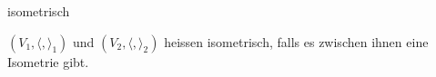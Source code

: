 \documentclass[class=article, crop=false]{standalone}
\begin{document}
\begin{zettel}{isometrisch}
\begin{flashcard}[]{}
	\begin{definition}[isometrisch]
		$(V_1, \langle ,\rangle _1)$ und $(V_2, \langle ,\rangle _2)$ heissen isometrisch, falls es zwischen ihnen eine Isometrie gibt.
	\end{definition}
\end{flashcard}
\end{zettel}
\end{document}
